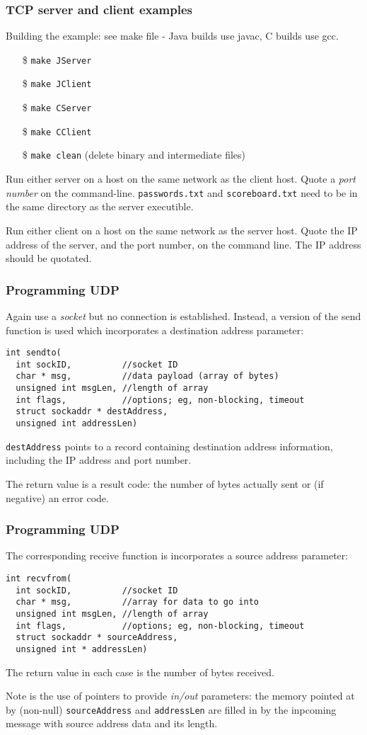\documentclass[10pt, hyperref={pdfpagelabels=false}]{beamer}
\begin{document}
\begin{frame}
\frametitle{TCP server and client examples}
Building the example: see make file - Java builds use javac, C builds use gcc.
\begin{itemize}
\item[\$]\texttt{make JServer}
\item[\$]\texttt{make JClient}
\item[\$]\texttt{make CServer}
\item[\$]\texttt{make CClient}
\item[\$]\texttt{make clean} (delete binary and intermediate files)
\end{itemize}

Run either server on a host on the same network as the client host. Quote a \emph{port number} on the command-line. \texttt{passwords.txt} and \texttt{scoreboard.txt} need to be in the same directory as the server executible.

Run either client on a host on the same network as the server host. Quote the IP address of the server, and the port number, on the command line. The IP address should be quotated. 
\end{frame}

\begin{frame} [fragile]
\frametitle{Programming UDP}
Again use a \emph{\color{blue}socket} but no connection is established. Instead,
a version of the send function is used which incorporates a destination address parameter:
{\color{blue}
\begin{verbatim}
int sendto(
  int sockID,          //socket ID
  char * msg,          //data payload (array of bytes)
  unsigned int msgLen, //length of array
  int flags,           //options; eg, non-blocking, timeout
  struct sockaddr * destAddress,
  unsigned int addressLen)
\end{verbatim}
}

\texttt{\color{blue}destAddress} points to a record containing destination address information, including the IP address and port number.

The return value is a result code: the number of bytes actually sent or (if negative) an error code.
\end{frame}

\begin{frame} [fragile]
\frametitle{Programming UDP}
The corresponding receive function is incorporates a source address parameter:
{\color{blue}
\begin{verbatim}
int recvfrom(
  int sockID,          //socket ID
  char * msg,          //array for data to go into
  unsigned int msgLen, //length of array
  int flags,           //options; eg, non-blocking, timeout
  struct sockaddr * sourceAddress,
  unsigned int * addressLen)
\end{verbatim}
}

The return value in each case is the number of bytes received. 

Note is the use of pointers to provide \emph{in/out} parameters: the memory pointed at by (non-null) \texttt{\color{blue}sourceAddress} and \texttt{\color{blue}addressLen} are filled in by the inpcoming message with source address data and its length.
\end{frame}
\end{document}
